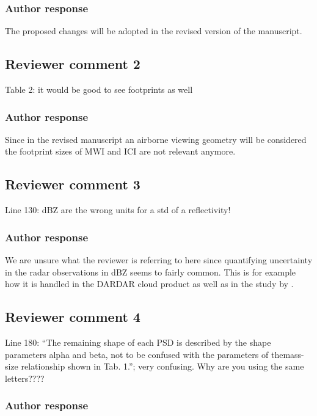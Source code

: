 \documentclass[11pt]{scrartcl}
\begin{document}
\subsubsection*{Author response}

The proposed changes will be adopted in the revised version of the manuscript.

\subsection*{Reviewer comment 2}

Table 2:  it would be good to see footprints as well

\subsubsection*{Author response}

Since in the revised manuscript an airborne viewing geometry will be considered
the footprint sizes of MWI and ICI are not relevant anymore.

\subsection*{Reviewer comment 3}
Line 130: dBZ are the wrong units for a std of a reflectivity!

\subsubsection*{Author response}

We are unsure what the reviewer is referring to here since quantifying
uncertainty in the radar observations in dBZ seems to fairly common. This is for
example how it is handled in the DARDAR cloud \citep{delanoe10} product as well
as in the study by \citet{jiang19}.

\subsection*{Reviewer comment 4}

Line 180: “The remaining shape of each PSD is described by the shape parameters
alpha and beta, not to be confused with the parameters of themass-size
relationship shown in Tab. 1.”; very confusing. Why are you using the
same letters????

\subsubsection*{Author response}
\end{document}
